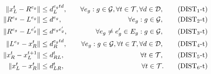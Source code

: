 
\begin{align*}
\|x_L^t- R^{e_g}\| & \leq  d_L^{e_gtd},  &\quad \forall e_g:g\in \mathcal{G}, \forall t\in \mathcal T, \forall d\in\mathcal D, \tag{DIST$_{1}$-t} \label{eq:d1}\\
\|R^{e_g}- L^{e_g}\| & \leq  d^{e_g},  &\quad \forall e_g:g\in \mathcal{G}, \tag{DIST$_{2}$-t} \label{eq:d2}\\
\|R^{e_g}- L^{e^\prime_g}\| & \leq  d^{e_ge^\prime_g}, &\quad \forall e_g\neq e_g'\in E_g:g\in \mathcal{G}, \tag{DIST$_{3}$-t} \label{eq:d3}\\
\|L^{e_g}- x_R^t\| & \leq  d_R^{e_gtd}, &\quad \forall e_g:g\in \mathcal{G},\forall t\in T, \forall d\in\mathcal D, \tag{DIST$_{4}$-t} \label{eq:d4}\\
\|x_R^t- x_L^{t+1}\| & \leq  d_{RL}^t, & \quad \forall t\in \mathcal T, \tag{DIST$_{5}$-t} \label{eq:d5}\\
\|x_L^t- x_R^t\| & \leq  d_{LR}^t, & \quad \forall t\in \mathcal T. \tag{DIST$_{6}$-t} \label{eq:d6}\\
\end{align*}

